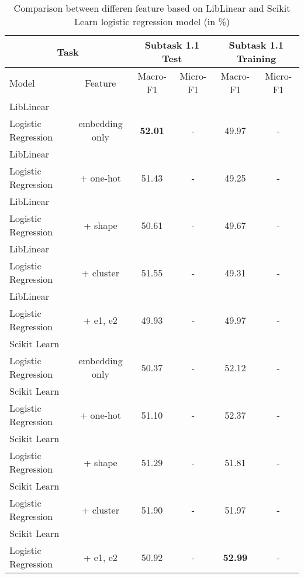 \begin{table}[htbp!] %
    \begin{tabular}{lccccc}
    \toprule
        \multicolumn{2}{c}{Task}                            & \multicolumn{2}{c}{Subtask 1.1 Test}  & \multicolumn{2}{c}{Subtask 1.1 Training} \\
    \midrule
        Model & Feature                                     & Macro-F1         & Micro-F1           & Macro-F1         & Micro-F1       \\
    \midrule
        LibLinear\\ Logistic Regression    & embedding only & \bf52.01         & -                  & 49.97            & -              \\
        LibLinear\\ Logistic Regression    & + one-hot      & 51.43            & -                  & 49.25            & -              \\
        LibLinear\\ Logistic Regression    & + shape        & 50.61            & -                  & 49.67            & -              \\
        LibLinear\\ Logistic Regression    & + cluster      & 51.55            & -                  & 49.31            & -              \\
        LibLinear\\ Logistic Regression    & + e1, e2       & 49.93            & -                  & 49.97            & -              \\
        Scikit Learn\\ Logistic Regression & embedding only & 50.37            & -                  & 52.12            & -              \\
        Scikit Learn\\ Logistic Regression & + one-hot      & 51.10            & -                  & 52.37            & -              \\
        Scikit Learn\\ Logistic Regression & + shape        & 51.29            & -                  & 51.81            & -              \\
        Scikit Learn\\ Logistic Regression & + cluster      & 51.90            & -                  & 51.97            & -              \\
        Scikit Learn\\ Logistic Regression & + e1, e2       & 50.92            & -                  & \bf52.99         & -              \\
    \bottomrule
    \end{tabular}
\caption{Comparison between differen feature based on LibLinear and Scikit Learn logistic regression model (in \%)}
\label{tab:feature}
\end{table}
